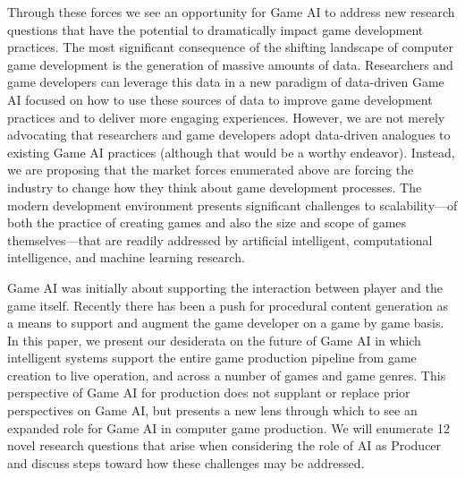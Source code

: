 \documentclass[conference]{IEEEtran}
\newcommand{\mytodo}[1]{\textbf{[[#1]]}}
\begin{document}
Through these forces we see an opportunity for Game AI to address new research questions that have the potential to dramatically impact game development practices.
%
The most significant consequence of the shifting landscape of computer game development is the generation of massive amounts of data. 
Researchers and game developers can leverage this data in a new paradigm of data-driven Game AI focused on how to use these sources of data to 
improve game development practices and to deliver more engaging experiences.
However, we are not merely advocating that researchers and game developers adopt data-driven analogues to existing Game AI practices (although that would be a worthy endeavor).
Instead, we are proposing that the market forces enumerated above are forcing the industry to change how they think about game development processes.
The modern development environment presents significant challenges to scalability---of both the practice of creating games and also the size and scope of games themselves---that are readily addressed by artificial intelligent, computational intelligence, and machine learning research.

Game AI was initially about supporting the interaction between player and the game itself.
Recently there has been a push for procedural content generation as a means to support and augment the game developer on a game by game basis.
%
In this paper, we present our desiderata on the future of Game AI
in which intelligent systems support the entire game production pipeline from game creation to live operation, and across a number of games and game genres.
This perspective of Game AI 
for production
does not supplant or replace prior perspectives on Game AI, but presents a new lens through which to see an expanded role for Game AI in computer game production. 
We will enumerate 12 novel research questions that arise when considering the role of AI as Producer and discuss steps toward how these challenges may be addressed. 
\end{document}
